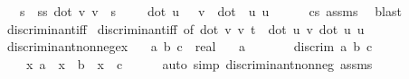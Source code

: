 \begin{isabellebody}
\ \ \ {\isachardoublequoteopen}{\isasymforall}s\ {\isachardot}{\kern0pt}\ s{\isacharasterisk}{\kern0pt}s{\isacharasterisk}{\kern0pt}\ dot\ v\ v\ {\isacharplus}{\kern0pt}\ s\ {\isacharasterisk}{\kern0pt}\ {}\ {\isacharasterisk}{\kern0pt}\ \ {\isacharparenleft}{\kern0pt}dot\ u\ \ \ v{\isacharparenright}{\kern0pt}\ {\isacharplus}{\kern0pt}\ {\isacharparenleft}{\kern0pt}dot\ \ u\ u{\isacharparenright}{\kern0pt}\ {\isasymge}\ {}{\isachardoublequoteclose}\isanewline
%
\isadelimproof
\ \ %
\endisadelimproof
%
\isatagproof
{}\isamarkupfalse%
\ cs{}\ assms\ \isamarkupfalse%
\ blast%
\endisatagproof
{\isafoldproof}%
%
\isadelimproof
\isanewline
%
\endisadelimproof
\isanewline
{}\isamarkupfalse%
\ discriminant{\isacharunderscore}{\kern0pt}iff\isanewline
\isanewline
{}\isamarkupfalse%
\ discriminant{\isacharunderscore}{\kern0pt}iff\ {\isacharbrackleft}{\kern0pt}of\ {\isachardoublequoteopen}{\isacharparenleft}{\kern0pt}dot\ v\ v{\isacharparenright}{\kern0pt}{\isachardoublequoteclose}\ t\ {\isachardoublequoteopen}{}{\isacharasterisk}{\kern0pt}\ {\isacharparenleft}{\kern0pt}dot\ u\ v{\isacharparenright}{\kern0pt}{\isachardoublequoteclose}\ {\isachardoublequoteopen}{\isacharparenleft}{\kern0pt}dot\ u\ u{\isacharparenright}{\kern0pt}{\isachardoublequoteclose}{\isacharbrackright}{\kern0pt}\isanewline
\isanewline
\isanewline
{}\isamarkupfalse%
\ discriminant{\isacharunderscore}{\kern0pt}nonneg{\isacharunderscore}{\kern0pt}ex{\isacharcolon}{\kern0pt}\isanewline
\ \ \ a\ b\ c\ {\isacharcolon}{\kern0pt}{\isacharcolon}{\kern0pt}\ real\isanewline
\ \ \ {\isachardoublequoteopen}a\ {\isasymnoteq}\ {}{\isachardoublequoteclose}\isanewline
\ \ \ \ \ {\isachardoublequoteopen}discrim\ a\ b\ c\ {\isasymge}\ {}{\isachardoublequoteclose}\isanewline
\ \ \ {\isachardoublequoteopen}{\isasymexists}\ x{\isachardot}{\kern0pt}\ a\ {\isacharasterisk}{\kern0pt}\ x\ {\isacharplus}{\kern0pt}\ b\ {\isacharasterisk}{\kern0pt}\ x\ {\isacharplus}{\kern0pt}\ c\ {\isacharequal}{\kern0pt}\ {}{\isachardoublequoteclose}\isanewline
%
\isadelimproof
\ \ %
\endisadelimproof
%
\isatagproof
{}\isamarkupfalse%
\ {\isacharparenleft}{\kern0pt}auto\ simp{\isacharcolon}{\kern0pt}\ discriminant{\isacharunderscore}{\kern0pt}nonneg\ assms{\isacharparenright}{\kern0pt}%
\endisatagproof
{\isafoldproof}%
%
\isadelimproof

\end{isabellebody}
